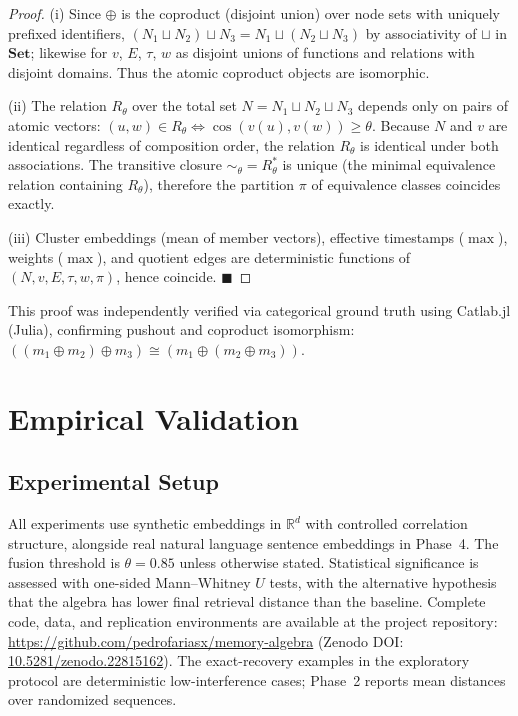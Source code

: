 \documentclass[11pt,a4paper]{article}
\theoremstyle{definition}
\begin{document}
\begin{proof}
(i) Since $\oplus$ is the coproduct (disjoint union) over node sets with uniquely prefixed identifiers, $(N_1 \sqcup N_2) \sqcup N_3 = N_1 \sqcup (N_2 \sqcup N_3)$ by associativity of $\sqcup$ in $\mathbf{Set}$; likewise for $v$, $E$, $\tau$, $w$ as disjoint unions of functions and relations with disjoint domains. Thus the atomic coproduct objects are isomorphic.

(ii) The relation $R_\theta$ over the total set $N = N_1 \sqcup N_2 \sqcup N_3$ depends only on pairs of atomic vectors: $(u, w) \in R_\theta \iff \cos(v(u), v(w)) \geq \theta$. Because $N$ and $v$ are identical regardless of composition order, the relation $R_\theta$ is identical under both associations. The transitive closure $\sim_\theta = R_\theta^*$ is unique (the minimal equivalence relation containing $R_\theta$), therefore the partition $\pi$ of equivalence classes coincides exactly.

(iii) Cluster embeddings (mean of member vectors), effective timestamps ($\max$), weights ($\max$), and quotient edges are deterministic functions of $(N, v, E, \tau, w, \pi)$, hence coincide. $\blacksquare$
\end{proof}

This proof was independently verified via categorical ground truth using Catlab.jl (Julia), confirming pushout and coproduct isomorphism: $((m_1 \oplus m_2) \oplus m_3) \cong (m_1 \oplus (m_2 \oplus m_3))$.

\section{Empirical Validation}\label{sec:empirical}

\subsection{Experimental Setup}

All experiments use synthetic embeddings in $\mathbb{R}^d$ with controlled correlation structure, alongside real natural language sentence embeddings in Phase~4. The fusion threshold is $\theta = 0.85$ unless otherwise stated. Statistical significance is assessed with one-sided Mann--Whitney $U$ tests, with the alternative hypothesis that the algebra has lower final retrieval distance than the baseline. Complete code, data, and replication environments are available at the project repository: \url{https://github.com/pedrofariasx/memory-algebra} (Zenodo DOI: \href{https://doi.org/10.5281/zenodo.22815162}{10.5281/zenodo.22815162}). The exact-recovery examples in the exploratory protocol are deterministic low-interference cases; Phase~2 reports mean distances over randomized sequences.
\end{document}
